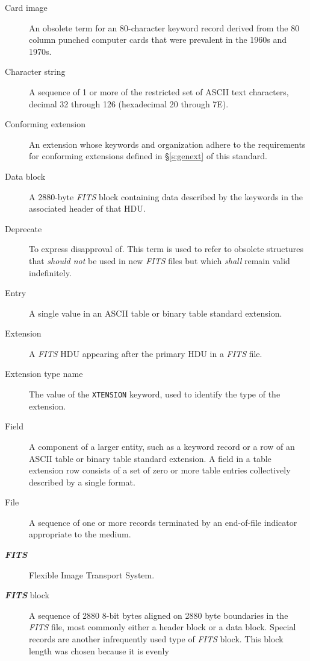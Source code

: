 \documentclass[11pt,makeidx]{book}     %
\begin{document}
\begin{description}
\item[Card image]  An obsolete term for an 80-character keyword record
     derived from the 80 column punched computer cards that were prevalent
     in the 1960s and 1970s.
\item[Character string] A sequence of 1 or more of the restricted set of ASCII text characters,
    decimal 32 through 126 (hexadecimal 20 through 7E). 
\item[Conforming extension] An extension whose keywords and
         organization
         adhere to the requirements for conforming extensions defined 
         in \S\ref{s:genext} of this 
         standard.
\item[Data block]  A 2880-byte {\em FITS\/} block containing data described by the
         keywords in the associated header of that HDU.
\item[Deprecate]  To express disapproval of. This term is used 
        to refer to obsolete structures that {\em should not} be used in
	new {\em FITS\/} files but which {\em shall} remain valid indefinitely.
\item[Entry] A single value in an ASCII table or  binary table standard extension.
\item[Extension] A {\em FITS\/} HDU 
     appearing after the primary HDU in a 
     {\em FITS\/} file.
\item[Extension type name] The value of the {\tt XTENSION}
   keyword, used to identify
   the type of the extension. 
\item[Field] A component of a larger entity, such as a keyword record or
    a row of an  ASCII table or binary table standard extension.  
    A field in a table extension row consists of a set of zero or more table 
     entries collectively described by a single format.
\item[File] A sequence of one or more records terminated by an end-of-file
             indicator appropriate to the medium.
\item[{\em\bf FITS}] Flexible Image Transport System.
\item[{\em\bf FITS} block] A sequence of 2880 8-bit bytes aligned on 2880 
byte boundaries in the {\em FITS\/} file, most commonly either a header 
block or a data block.  Special records are another infrequently used type
of {\em FITS\/} block.    This block length was chosen because it is evenly

\end{description}
\end{document}
